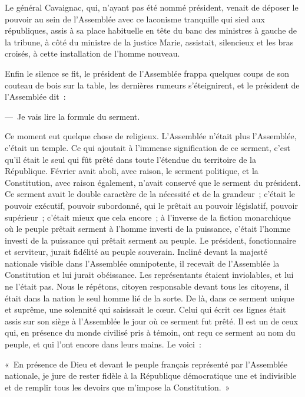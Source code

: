 \documentclass[french,twoside]{book} %
\newenvironment{quoteblock}%
  {\begin{quoting}}
  {\end{quoting}}
\newenvironment{quotebar}{%
    \def\FrameCommand{{\color{rubric!10!}\vrule width 0.5em} \hspace{0.9em}}%
    \def\OuterFrameSep{0pt} %
    \MakeFramed {\advance\hsize-\width \FrameRestore}
  }%
  {%
    \endMakeFramed
  }
\renewenvironment{quoteblock}%
  {%
    \savenotes
    \setstretch{0.9}
    \begin{quotebar}
    \smallskip
  }
  {%
    \smallskip
    \end{quotebar}
    \spewnotes
  }
\begin{document}
Le général Cavaignac, qui, n’ayant pas été nommé président, venait de déposer le pouvoir au sein de l’Assemblée avec ce laconisme tranquille qui sied aux républiques, assis à sa place habituelle en tête du banc des ministres à gauche de la tribune, à côté du ministre de la justice Marie, assistait, silencieux et les bras croisés, à cette installation de l’homme nouveau.\par
Enfin le silence se fit, le président de l’Assemblée frappa quelques coups de son couteau de bois sur la table, les dernières rumeurs s’éteignirent, et le président de l’Assemblée dit :\par
— Je vais lire la formule du serment.\par
Ce moment eut quelque chose de religieux. L’Assemblée n’était plus l’Assemblée, c’était un temple. Ce qui ajoutait à l’immense signification de ce serment, c’est qu’il était le seul qui fût prêté dans toute l’étendue du territoire de la République. Février avait aboli, avec raison, le serment politique, et la Constitution, avec raison également, n’avait conservé que le serment du président. Ce serment avait le double caractère de la nécessité et de la grandeur ; c’était le pouvoir exécutif, pouvoir subordonné, qui le prêtait au pouvoir législatif, pouvoir supérieur ; c’était mieux que cela encore ; à l’inverse de la fiction monarchique où le peuple prêtait serment à l’homme investi de la puissance, c’était l’homme investi de la puissance qui prêtait serment au peuple. Le président, fonctionnaire et serviteur, jurait fidélité au peuple souverain. Incliné devant la majesté nationale visible dans l’Assemblée omnipotente, il recevait de l’Assemblée la Constitution et lui jurait obéissance. Les représentants étaient inviolables, et lui ne l’était pas. Nous le répétons, citoyen responsable devant tous les citoyens, il était dans la nation le seul homme lié de la sorte. De là, dans ce serment unique et suprême, une solennité qui saisissait le cœur. Celui qui écrit ces lignes était assis sur son siège à l’Assemblée le jour où ce serment fut prêté. Il est un de ceux qui, en présence du monde civilisé pris à témoin, ont reçu ce serment au nom du peuple, et qui l’ont encore dans leurs mains. Le voici :\par

\begin{quoteblock}
 \noindent « En présence de Dieu et devant le peuple français représenté par l’Assemblée nationale, je jure de rester fidèle à la République démocratique une et indivisible et de remplir tous les devoirs que m’impose la Constitution. »
 \end{quoteblock}
\end{document}
